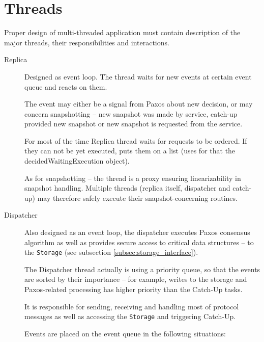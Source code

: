 \section{Threads}
\label{sec:threads}

Proper design of multi-threaded application must contain description of the major threads, their responsibilities and interactions.

\begin{description}
  \item[Replica] \hfill
    
    Designed as event loop. The thread waits for new events at certain event queue and reacts on them.

    The event may either be a signal from Paxos about new decision, or may concern snapshotting -- new snapshot was made by service, catch-up provided new snapshot or new snapshot is requested from the service.

    For most of the time Replica thread waits for requests to be ordered. If they can not be yet executed, puts them on a list (uses for that the decidedWaitingExecution object).
    
    As for snapshotting -- the thread is a proxy ensuring linearizability in snapshot handling.
    Multiple threads (replica itself, dispatcher and catch-up) may therefore safely execute their snapshot-concerning routines.
    
  \item[Dispatcher] \hfill \nopagebreak
    
    Also designed as an event loop, the dispatcher executes Paxos consensus algorithm as well as provides secure access to critical data structures -- to the \texttt{Storage} (see subsection \ref{subsec:storage_interface}).
    
    The Dispatcher thread actually is using a priority queue, so that the events are sorted by their importance -- for example, writes to the storage and Paxos-related processing has higher priority than the Catch-Up tasks.
    
    It is responsible for sending, receiving and handling most of protocol messages as well as accessing the \texttt{Storage} and triggering Catch-Up.
    
    Events are placed on the event queue in the following situations:
    

\end{description}
